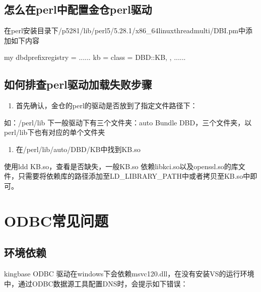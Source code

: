 \documentclass[a4,10pt,oneside,english]{sphinxmanual}
\begin{document}
\subsection{怎么在perl中配置金仓perl驱动}
\label{\detokenize{interface/perl:perlperl}}
在perl安装目录下/p5281/lib/perl5/5.28.1/x86\_64\sphinxhyphen{}linux\sphinxhyphen{}thread\sphinxhyphen{}multi/DBI.pm中添加如下内容

\begin{sphinxVerbatim}[commandchars=\\\{\}]
my \PYGZdl{}dbd\PYGZus{}prefix\PYGZus{}registry = \PYGZob{}
                                               ......
                                               kb\PYGZus{}          =\PYGZgt{} \PYGZob{} class  =\PYGZgt{} \PYGZsq{}DBD::KB\PYGZsq{},      \PYGZcb{},
                                              ......
\PYGZcb{}
\end{sphinxVerbatim}


\subsection{如何排查perl驱动加载失败步骤}
\label{\detokenize{interface/perl:id3}}\begin{enumerate}
%
\item {} 
首先确认，金仓的perl的驱动是否放到了指定文件路径下：

\end{enumerate}

如：/perl/lib 下一般驱动下有三个文件夹：auto Bundle DBD，三个文件夹，以perl/lib下也有对应的单个文件夹
\begin{enumerate}
%
\setcounter{enumi}{1}
\item {} 
在/perl/lib/auto/DBD/KB中找到KB.so

\end{enumerate}

使用ldd KB.so，查看是否缺失，一般KB.so 依赖libkci.so以及openssl.so的库文件，只需要将依赖库的路径添加至LD\_LIBRARY\_PATH中或者拷贝至KB.so中即可。


\section{ODBC常见问题}
\label{\detokenize{interface/odbc:odbc}}\label{\detokenize{interface/odbc::doc}}

\subsection{环境依赖}
\label{\detokenize{interface/odbc:id1}}
kingbase ODBC 驱动在windows下会依赖msvc120.dll，在没有安装VS的运行环境中，通过ODBC数据源工具配置DNS时，会提示如下错误：
\end{document}
